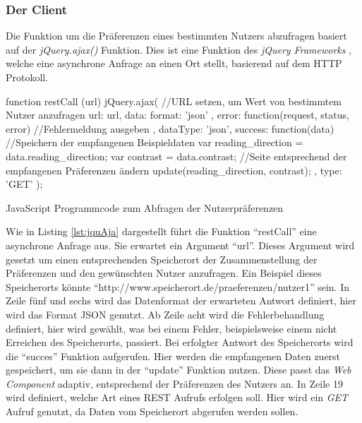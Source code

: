 \documentclass[12pt, paper=a4, bibtotoc, toc=listof, headsepline=true]{scrreprt}
\begin{document}
		\subsubsection{Der Client}
		Die Funktion um die Präferenzen eines bestimmten Nutzers abzufragen basiert auf der \emph{jQuery.ajax()} Funktion. Dies ist eine Funktion des \emph{jQuery Frameworks} , welche eine asynchrone Anfrage an einen Ort stellt, basierend auf dem \ac{HTTP} Protokoll.\cite{jquAja}
		\begin{listing}
			\begin{JavaScriptcode*}{}
function restCall (url){
   jQuery.ajax({
      //URL setzen, um Wert von bestimmtem Nutzer anzufragen
      url: url,
      data: {
         format: 'json'
      },
      error: function(request, status, error) {
         //Fehlermeldung ausgeben
      },
      dataType: 'json',
      success: function(data) {
         //Speichern der empfangenen Beispieldaten
         var reading_direction = data.reading_direction;
         var contrast = data.contrast;
         //Seite entsprechend der empfangenen Präferenzen ändern
         update(reading_direction, contrast);
      },
      type: 'GET'
   });
}
			\end{JavaScriptcode*}
			\caption[Abfragen der Nutzerpräferenzen]{JavaScript Programmcode zum Abfragen der Nutzerpräferenzen}
			\label{lst:jquAja}
		\end{listing}
		Wie in Listing \ref{lst:jquAja} dargestellt führt die Funktion \enquote{restCall} eine asynchrone Anfrage aus. Sie erwartet ein Argument \enquote{url}. Dieses Argument wird gesetzt um einen entsprechenden Speicherort der Zusammenstellung der Präferenzen und den gewünschten Nutzer anzufragen. Ein Beispiel dieses Speicherorts könnte \newline \enquote{http://www.speicherort.de/praeferenzen/nutzer1} sein. In Zeile fünf und sechs wird das Datenformat der erwarteten Antwort definiert, hier wird das Format \ac{JSON} genutzt. Ab Zeile acht wird die Fehlerbehandlung definiert, hier wird gewählt, was bei einem Fehler, beispielsweise einem nicht Erreichen des Speicherorts, passiert. Bei erfolgter Antwort des Speicherorts wird die \enquote{succes} Funktion aufgerufen. Hier werden die empfangenen Daten zuerst gespeichert, um sie dann in der \enquote{update} Funktion nutzen. Diese passt das \emph{Web Component} adaptiv, entsprechend der Präferenzen des Nutzers an. In Zeile 19 wird definiert, welche Art eines \ac{REST} Aufrufs erfolgen soll. Hier wird ein \emph{GET} Aufruf genutzt, da Daten vom Speicherort abgerufen werden sollen.
\end{document}
